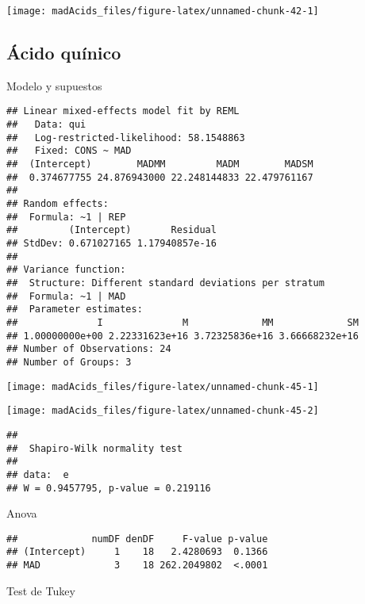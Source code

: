 \documentclass[
]{article}
\begin{document}
\begin{center}\texttt{[image: madAcids\_files/figure-latex/unnamed-chunk-42-1]} \end{center}

\subsection{Ácido quínico}\label{uxe1cido-quuxednico-1}

Modelo y supuestos

\begin{verbatim}
## Linear mixed-effects model fit by REML
##   Data: qui 
##   Log-restricted-likelihood: 58.1548863
##   Fixed: CONS ~ MAD 
##  (Intercept)        MADMM         MADM        MADSM 
##  0.374677755 24.876943000 22.248144833 22.479761167 
## 
## Random effects:
##  Formula: ~1 | REP
##         (Intercept)       Residual
## StdDev: 0.671027165 1.17940857e-16
## 
## Variance function:
##  Structure: Different standard deviations per stratum
##  Formula: ~1 | MAD 
##  Parameter estimates:
##              I              M             MM             SM 
## 1.00000000e+00 2.22331623e+16 3.72325836e+16 3.66668232e+16 
## Number of Observations: 24
## Number of Groups: 3
\end{verbatim}

\begin{center}\texttt{[image: madAcids\_files/figure-latex/unnamed-chunk-45-1]} \end{center}

\begin{center}\texttt{[image: madAcids\_files/figure-latex/unnamed-chunk-45-2]} \end{center}

\begin{verbatim}
## 
##  Shapiro-Wilk normality test
## 
## data:  e
## W = 0.9457795, p-value = 0.219116
\end{verbatim}

Anova

\begin{verbatim}
##             numDF denDF     F-value p-value
## (Intercept)     1    18   2.4280693  0.1366
## MAD             3    18 262.2049802  <.0001
\end{verbatim}

Test de Tukey
\end{document}

